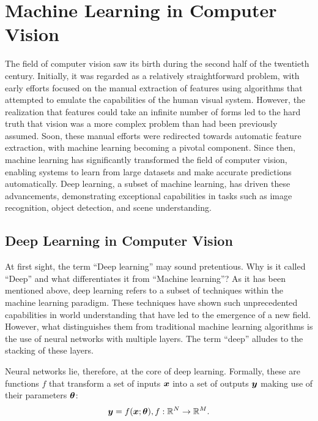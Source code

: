 
\section{Machine Learning in Computer Vision}

The field of computer vision saw its birth during the second half of the twentieth century. Initially, it was regarded as a relatively straightforward problem, with early efforts focused on the manual extraction of features using algorithms that attempted to emulate the capabilities of the human visual system. However, the realization that features could take an infinite number of forms led to the hard truth that vision was a more complex problem than had been previously assumed. Soon, these manual efforts were redirected towards automatic feature extraction, with machine learning becoming a pivotal component. Since then, machine learning has significantly transformed the field of computer vision, enabling systems to learn from large datasets and make accurate predictions automatically. Deep learning, a subset of machine learning, has driven these advancements, demonstrating exceptional capabilities in tasks such as image recognition, object detection, and scene understanding. 

\subsection{Deep Learning in Computer Vision}
\label{subsec:deep_learning}
At first sight, the term ``Deep learning'' may sound pretentious. Why is it called ``Deep'' and what differentiates it from ``Machine learning''?  As it has been mentioned above, deep learning refers to a subset of techniques within the machine learning paradigm. These techniques have shown such unprecedented capabilities in world understanding that have led to the emergence of a new field. However, what distinguishes them from traditional machine learning algorithms is the use of neural networks with multiple layers. The term ``deep'' alludes to the stacking of these layers.

Neural networks lie, therefore, at the core of deep learning. Formally, these are functions $f$ that transform a set of inputs $\boldsymbol{x}$ into a set of outputs $\boldsymbol{y}$ making use of their parameters $\boldsymbol{\theta}$: 
\begin{equation*}
    \boldsymbol{y} = f(\boldsymbol{x};\boldsymbol{\theta}), f: \mathbb{R}^N \rightarrow \mathbb{R}^M.
\end{equation*}

